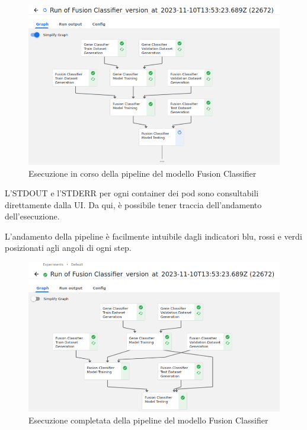\begin{figure}[H]
    \centering
    \includegraphics[width=\linewidth]{figures/ch4and5/fusion_pending.png}
    \caption[Esecuzione in corso della pipeline del modello Fusion Classifier]{Esecuzione in corso della pipeline del modello Fusion Classifier}
    \label{fig:cha6:kf-f-pend}
\end{figure}

L'STDOUT e l'STDERR per ogni container dei pod sono consultabili direttamente dalla UI. Da qui, è possibile tener traccia dell'andamento dell'esecuzione.

L'andamento della pipeline è facilmente intuibile dagli indicatori blu, rossi e verdi posizionati agli angoli di ogni step.

\begin{figure}[H]
    \centering
    \includegraphics[width=\linewidth]{figures/ch4and5/fusion_compl.png}
    \caption[Esecuzione completata della pipeline del modello Fusion Classifier]{Esecuzione completata della pipeline del modello Fusion Classifier}
    \label{fig:cha6:kf-f-done}
\end{figure}

